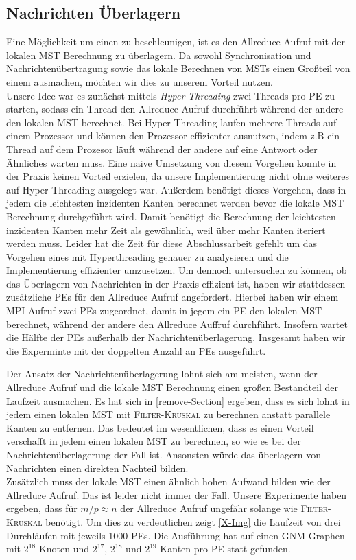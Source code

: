 \subsection{Nachrichten Überlagern}
Eine Möglichkeit um einen \boruvkaStep zu beschleunigen, ist es den Allreduce Aufruf mit der lokalen MST Berechnung zu überlagern. Da sowohl Synchronisation und Nachrichtenübertragung sowie das lokale Berechnen von MSTs einen Großteil von einem \boruvkaStep ausmachen, möchten wir dies zu unserem Vorteil nutzen.\\
Unsere Idee war es zunächst mittels \emph{Hyper-Threading} zwei Threads pro PE zu starten, sodass ein Thread den Allreduce Aufruf durchführt während der andere den lokalen MST berechnet. Bei Hyper-Threading laufen mehrere Threads auf einem Prozessor und können den Prozessor effizienter ausnutzen, indem z.B ein Thread auf dem Prozesor läuft während der andere auf eine Antwort oder Ähnliches warten muss.
Eine naive Umsetzung von diesem Vorgehen konnte in der Praxis keinen Vorteil erzielen, da unsere Implementierung nicht ohne weiteres auf Hyper-Threading ausgelegt war. Außerdem benötigt dieses Vorgehen, dass in jedem \boruvkaStep die leichtesten inzidenten Kanten berechnet werden bevor die lokale MST Berechnung durchgeführt wird. Damit benötigt die Berechnung der leichtesten inzidenten Kanten mehr Zeit als gewöhnlich, weil über mehr Kanten iteriert werden muss.
Leider hat die Zeit für diese Abschlussarbeit gefehlt um das Vorgehen eines \boruvkaStep mit Hyperthreading genauer zu analysieren und die Implementierung effizienter umzusetzen. Um dennoch untersuchen zu können, ob das Überlagern von Nachrichten in der Praxis effizient ist, haben wir stattdessen zusätzliche PEs für den Allreduce Aufruf angefordert. Hierbei haben wir einem MPI Aufruf zwei PEs zugeordnet, damit in jegem \boruvkaStep ein PE den lokalen MST berechnet, während der andere den Allreduce Auffruf durchführt. Insofern wartet die Hälfte der PEs außerhalb der Nachrichtenüberlagerung.
Insgesamt haben wir die Experminte mit der doppelten Anzahl an PEs ausgeführt.

Der Ansatz der Nachrichtenüberlagerung lohnt sich am meisten, wenn der Allreduce Aufruf und die lokale MST Berechnung einen großen Bestandteil der Laufzeit ausmachen.
Es hat sich in \cref{remove-Section} ergeben, dass es sich lohnt in jedem \boruvkaStep einen lokalen MST mit \textsc{Filter-Kruskal} zu berechnen anstatt parallele Kanten zu entfernen. Das bedeutet im wesentlichen, dass es einen Vorteil verschafft in jedem \boruvkaStep einen lokalen MST zu berechnen, so wie es bei der Nachrichtenüberlagerung der Fall ist. Ansonsten würde das überlagern von Nachrichten einen direkten Nachteil bilden.\\
Zusätzlich muss der lokale MST einen ähnlich hohen Aufwand bilden wie der Allreduce Aufruf. Das ist leider nicht immer der Fall. Unsere Experimente haben ergeben, dass für $m/p \approx n$ der Allreduce Aufruf ungefähr solange wie \textsc{Filter-Kruskal} benötigt. Um dies zu verdeutlichen zeigt \cref{X-Img} die Laufzeit von drei \boruvkaAllreduce Durchläufen mit jeweils 1000 PEs. Die Ausführung hat auf einen GNM Graphen mit $2^{18}$ Knoten und $2^{17}$, $2^{18}$ und $2^{19}$ Kanten pro PE statt gefunden.


